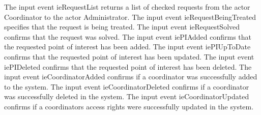 \begin{actortable}
							 {The input event ieRequestList returns a list of checked requests from the actor Coordinator 
							 to the actor Administrator.}
							 {The input event ieRequestBeingTreated specifies that the request is being treated.}
							 {The input event ieRequestSolved confirms that the request was solved.}
							 {The input event iePIAdded confirms that the requested point of interest has been added.}
							 {The input event iePIUpToDate confirms that the requested point of interest has been updated.}
							 {The input event iePIDeleted confirms that the requested point of interest has been deleted.}
							 {The input event ieCoordinatorAdded confirms if a coordinator was successfully added to the system.}
							 {The input event ieCoordinatorDeleted confirms if a coordinator was successfully deleted in the system.}
							 {The input event ieCoordinatorUpdated confirms if a coordinators access rights were successfully updated in the system.}
	
\end{actortable}
